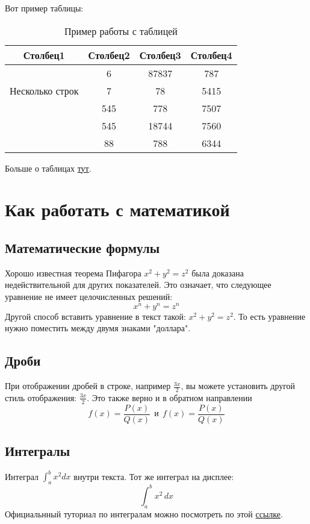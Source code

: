 Вот пример таблицы:

\begin{table}[h!]
\centering
\begin{tabular}{|c|c|c|c|} 
    \hline
    Столбец1 & Столбец2 & Столбец3 & Столбец4 \\ [0.5ex] 
        \hline
        \multirow{3}{5em}{Несколько строк} & 6 & 87837 & 787 \\ 
        &  7 & 78 & 5415 \\
        & 545 & 778 & 7507 \\
        & 545 & 18744 & 7560 \\
        & 88 & 788 & 6344 \\ [1ex] 
    \hline
\end{tabular}
\caption{Пример работы с таблицей}
\label{table:1}
\end{table}


Больше о таблицах \href{https://www.overleaf.com/learn/latex/Tables}{тут}.

\section{Как работать с математикой}

    \subsection{Математические формулы}
    Хорошо известная теорема Пифагора \(x^2 + y^2 = z^2\) была
    доказана недействительной для других показателей.
    Это означает, что следующее уравнение не имеет целочисленных решений:
    \[ x^n + y^n = z^n \]
    Другой способ вставить уравнение в текст такой: $x^2 + y^2 = z^2$. То есть уравнение нужно поместить между двумя знаками "доллара".

    \subsection{Дроби}
    При отображении дробей в строке, например \(\frac{3x}{2}\),
    вы можете установить другой стиль отображения:
    \( \displaystyle \frac{3x}{2} \).
    Это также верно и в обратном направлении
    \[ f(x)=\frac{P(x)}{Q(x)} \ \ \textrm{и}
    \ \ f(x)=\textstyle\frac{P(x)}{Q(x)} \]

    \subsection{Интегралы}
    Интеграл \(\int_{a}^{b} x^2 dx\) внутри текста.
    \medskip
    Тот же интеграл на дисплее:
    \[
    \int_{a}^{b} x^2 \,dx
    \]
    Официальнный туториал по интегралам можно посмотреть по этой  \href{https://www.overleaf.com/learn/latex/Integrals,_sums_and_limits#Integrals}{ссылке}.

